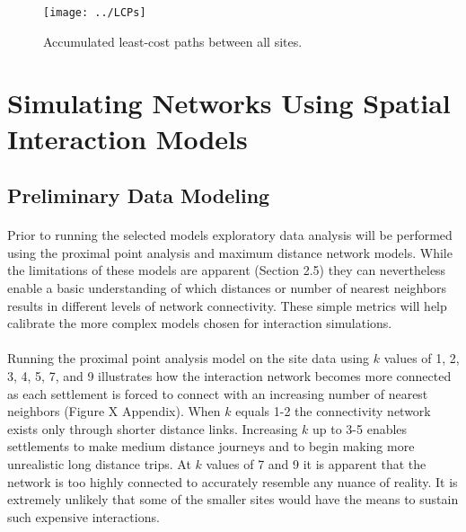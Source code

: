 \documentclass[12pt,a4paper]{thesis}
\begin{document}
\begin{figure}
\centering
\texttt{[image: ../LCPs]}
\caption{Accumulated least-cost paths between all sites.}
\label{fig:LCPs}
\end{figure}

\section{Simulating Networks Using Spatial Interaction Models}

\subsection{Preliminary Data Modeling}
\paragraph{}
Prior to running the selected models exploratory data analysis will be performed using the proximal point analysis and maximum distance network models. While the limitations of these models are apparent (Section 2.5) they can nevertheless enable a basic understanding of which distances or number of nearest neighbors results in different levels of network connectivity. These simple metrics will help calibrate the more complex models chosen for interaction simulations.

\paragraph{}
Running the proximal point analysis model on the site data using $k$ values of 1, 2, 3, 4, 5, 7, and 9 illustrates how the interaction network becomes more connected as each settlement is forced to connect with an increasing number of nearest neighbors (Figure X Appendix). When $k$ equals 1-2 the connectivity network exists only through shorter distance links. Increasing $k$ up to 3-5 enables settlements to make medium distance journeys and to begin making more unrealistic long distance trips. At $k$ values of 7 and 9 it is apparent that the network is too highly connected to accurately resemble any nuance of reality. It is extremely unlikely that some of the smaller sites would have the means to sustain such expensive interactions. 
\end{document}
